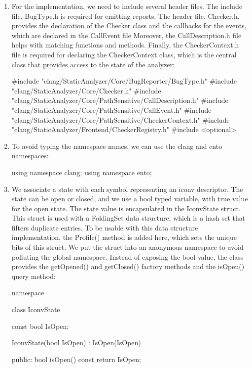 \begin{enumerate}
\item
For the implementation, we need to include several header files. The include file, BugType.h is required for emitting reports. The header file, Checker.h, provides the declaration of the Checker class and the callbacks for the events, which are declared in the CallEvent file Moreover, the CallDescription.h file helps with matching functions and methods. Finally, the CheckerContext.h file is required for declaring the CheckerContext class, which is the central class that provides access to the state of the analyzer:

\begin{cpp}
#include "clang/StaticAnalyzer/Core/BugReporter/BugType.h"
#include "clang/StaticAnalyzer/Core/Checker.h"
#include "clang/StaticAnalyzer/Core/PathSensitive/CallDescription.h"
#include "clang/StaticAnalyzer/Core/PathSensitive/CallEvent.h"
#include "clang/StaticAnalyzer/Core/PathSensitive/CheckerContext.h"
#include "clang/StaticAnalyzer/Frontend/CheckerRegistry.h"
#include <optional>
\end{cpp}

\item
To avoid typing the namespace names, we can use the clang and ento namespaces:

\begin{cpp}
using namespace clang;
using namespace ento;
\end{cpp}

\item
We associate a state with each symbol representing an iconv descriptor. The state can be open or closed, and we use a bool typed variable, with true value for the open state. The state value is encapsulated in the IconvState struct. This struct is used with a FoldingSet data structure, which is a hash set that filters duplicate entries. To be usable with this data structure implementation, the Profile() method is added here, which sets the unique bits of this struct. We put the struct into an anonymous namespace to avoid polluting the global namespace. Instead of exposing the bool value, the class provides the getOpened() and getClosed() factory methods and the isOpen() query method:

\begin{cpp}
namespace {
class IconvState {
    const bool IsOpen;

    IconvState(bool IsOpen) : IsOpen(IsOpen) {}

public:
    bool isOpen() const { return IsOpen; }

}}
\end{cpp}
\end{enumerate}
